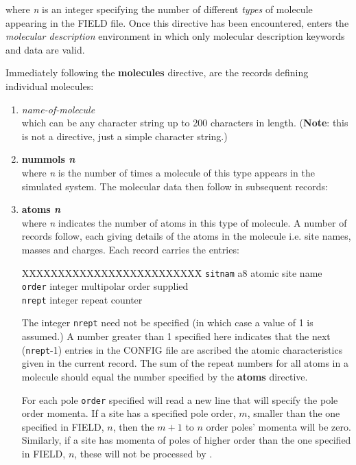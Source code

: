 
\noindent where {\em n} is an integer specifying the number of
different {\em types} of molecule appearing in the FIELD file.
Once this directive has been encountered, \D enters the {\em
molecular description} environment in which only molecular
description keywords and data are valid.

Immediately following the {\bf molecules} directive, are the records
defining individual molecules:

\begin{enumerate}

\item {\em name-of-molecule} \\
which can be any character string up to 200 characters in length.
({\bf Note}: this is not a directive, just a simple character string.)

\item {\bf nummols {\em n}} \\
where {\em n} is the number of times a molecule of this type
appears in the simulated system.  The molecular data then follow
in subsequent records:

\item {\bf atoms {\em n}} \\
where {\em n} indicates the number of atoms in this type of
molecule.  A number of records follow, each giving details of the
atoms in the molecule i.e. site names, masses and charges.  Each
record carries the entries:
\begin{tabbing}
X\=XXXXXXXXXXXX\=XXXXXXXXXXXX\=\kill
\> {\tt sitnam} \> a8      \> atomic site name \\
\> {\tt order}  \> integer \> multipolar order supplied \\
\> {\tt nrept}  \> integer \> repeat counter
\end{tabbing}
The integer {\tt nrept} need not be specified (in which case a value
of 1 is assumed.)  A number greater than 1 specified here indicates
that the next ({\tt nrept}-1) entries in the CONFIG file are ascribed
the atomic characteristics given in the current record.  The sum of the
repeat numbers for all atoms in a molecule should equal the number
specified by the {\bf atoms} directive.

For each pole {\tt order} specified \D will read a new line that
will specify the pole order momenta.  If a site has a specified
pole order, $m$, smaller than the one specified in FIELD, $n$,
then the $m+1$ to $n$ order poles' momenta will be zero.
Similarly, if a site has momenta of poles of higher order than
the one specified in FIELD, $n$, these will not be processed by \D.


\end{enumerate}
